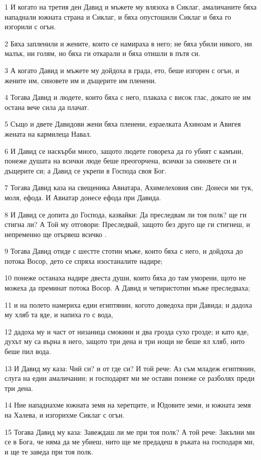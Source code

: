 \par 1 И когато на третия ден Давид и мъжете му влязоха в Сиклаг, амаличаните бяха нападнали южната страна и Сиклаг, и бяха опустошили Сиклаг и бяха го изгорили с огън.
\par 2 Бяха запленили и жените, които се намираха в него; не бяха убили никого, ни малък, ни голям, но бяха ги откарали и бяха отишли в пътя си.
\par 3 А когато Давид и мъжете му дойдоха в града, ето, беше изгорен с огън, и жените им, синовете им и дъщерите им пленени.
\par 4 Тогава Давид и людете, които бяха с него, плакаха с висок глас, докато не им остана вече сила да плачат.
\par 5 Също и двете Давидови жени бяха пленени, езраелката Ахиноам и Авигея жената на кармилеца Навал.
\par 6 И Давид се наскърби много, защото людете говореха да го убият с камъни, понеже душата на всички люде беше преогорчена, всички за синовете си и дъщерите си; а Давид се укрепи в Господа своя Бог.
\par 7 Тогава Давид каза на свещеника Авиатара, Ахимелеховия син: Донеси ми тук, моля, ефода. И Авиатар донесе ефода при Давида.
\par 8 И Давид се допита до Господа, казвайки: Да преследвам ли тоя полк? ще ги стигна ли? А Той му отговори: Преследвай, защото без друго ще ги стигнеш, и непременно ще отървеш всичко .
\par 9 Тогава Давид отиде с шестте стотин мъже, които бяха с него, и дойдоха до потока Восор, дето се спряха изостаналите надире;
\par 10 понеже останаха надире двеста души, които бяха до там уморени, щото не можеха да преминат потока Восор. А Давид и четиристотин мъже преследваха;
\par 11 и на полето намериха един египтянин, когото доведоха при Давида; и дадоха му хляб та яде, и напиха го с вода,
\par 12 дадоха му и част от низаница смокини и два грозда сухо грозде; и като яде, духът му са върна в него, защото три дена и три нощи не беше ял хляб, нито беше пил вода.
\par 13 И Давид му каза: Чий си? и от где си? И той рече: Аз съм младеж египтянин, слуга на един амаличанин; и господарят ми ме остави понеже се разболях преди три дена.
\par 14 Ние нападнахме южната земя на херетците, и Юдовите земи, и южната земя на Халева, и изгорихме Сиклаг с огън.
\par 15 Тогава Давид му каза: Завеждаш ли ме при тоя полк? А той рече: Закълни ми се в Бога, че няма да ме убиеш, нито ще ме предадеш в ръката на господаря ми, и ще те заведа при тоя полк.
